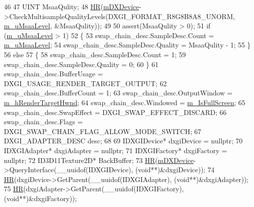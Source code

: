 \begin{DoxyCode}
46 
47     UINT MsaaQulity;
48     \hyperlink{_comet_engine_d_x_renderer_8cpp_a924cd8cbf81756869040aed04fd33ca5}{HR}(\hyperlink{class_comet_engine_1_1_renderer_1_1_comet_engine_d_x_renderer_ac606b85554250d2e65a2aa9f10e6aa45}{mDXDevice}->CheckMultisampleQualityLevels(DXGI\_FORMAT\_R8G8B8A8\_UNORM, 
      \hyperlink{class_comet_engine_1_1_renderer_1_1_comet_engine_d_x_renderer_aee26a00f9adfbcf0a5de3a91ec7e322d}{m\_uMsaaLevel}, &MsaaQulity));
49 
50     assert(MsaaQulity > 0);
51     \textcolor{keywordflow}{if} (\hyperlink{class_comet_engine_1_1_renderer_1_1_comet_engine_d_x_renderer_aee26a00f9adfbcf0a5de3a91ec7e322d}{m\_uMsaaLevel} > 1)
52     \{
53         swap\_chain\_desc.SampleDesc.Count = \hyperlink{class_comet_engine_1_1_renderer_1_1_comet_engine_d_x_renderer_aee26a00f9adfbcf0a5de3a91ec7e322d}{m\_uMsaaLevel};
54         swap\_chain\_desc.SampleDesc.Quality = MsaaQulity - 1;
55     \}
56     \textcolor{keywordflow}{else}
57     \{
58         swap\_chain\_desc.SampleDesc.Count = 1;
59         swap\_chain\_desc.SampleDesc.Quality = 0;
60     \}
61     swap\_chain\_desc.BufferUsage = DXGI\_USAGE\_RENDER\_TARGET\_OUTPUT;
62     swap\_chain\_desc.BufferCount = 1;
63     swap\_chain\_desc.OutputWindow = \hyperlink{class_comet_engine_1_1_renderer_1_1_comet_engine_d_x_renderer_a6ec5b124115c13d09e631e3245ba0264}{m\_hRenderTargetHwnd};
64     swap\_chain\_desc.Windowed = \hyperlink{class_comet_engine_1_1_renderer_1_1_comet_engine_d_x_renderer_aa6179af78a783f7c0d77d6ea9b95abfb}{m\_IsFullScreen};
65     swap\_chain\_desc.SwapEffect = DXGI\_SWAP\_EFFECT\_DISCARD;
66     swap\_chain\_desc.Flags = DXGI\_SWAP\_CHAIN\_FLAG\_ALLOW\_MODE\_SWITCH;
67     DXGI\_ADAPTER\_DESC desc;
68 
69     IDXGIDevice*    dxgiDevice = \textcolor{keyword}{nullptr};
70     IDXGIAdapter*   dxgiAdapter = \textcolor{keyword}{nullptr};
71     IDXGIFactory*   dxgiFactory = \textcolor{keyword}{nullptr};
72     ID3D11Texture2D* BackBuffer;
73     \hyperlink{_comet_engine_d_x_renderer_8cpp_a924cd8cbf81756869040aed04fd33ca5}{HR}(\hyperlink{class_comet_engine_1_1_renderer_1_1_comet_engine_d_x_renderer_ac606b85554250d2e65a2aa9f10e6aa45}{mDXDevice}->QueryInterface(\_\_uuidof(IDXGIDevice), (\textcolor{keywordtype}{void}**)&dxgiDevice));
74     \hyperlink{_comet_engine_d_x_renderer_8cpp_a924cd8cbf81756869040aed04fd33ca5}{HR}(dxgiDevice->GetParent(\_\_uuidof(IDXGIAdapter), (\textcolor{keywordtype}{void}**)&dxgiAdapter));
75     \hyperlink{_comet_engine_d_x_renderer_8cpp_a924cd8cbf81756869040aed04fd33ca5}{HR}(dxgiAdapter->GetParent(\_\_uuidof(IDXGIFactory), (\textcolor{keywordtype}{void}**)&dxgiFactory));

\end{DoxyCode}
